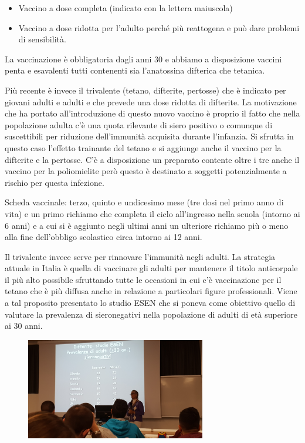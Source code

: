 \begin{itemize}
\item
  Vaccino a dose completa (indicato con la lettera maiuscola)
\item
  Vaccino a dose ridotta per l'adulto perché più reattogena e può dare
  problemi di sensibilità.
\end{itemize}
  La vaccinazione è obbligatoria dagli anni 30 e abbiamo a disposizione
  vaccini penta e esavalenti tutti contenenti sia l'anatossina difterica
  che tetanica.

  Più recente è invece il trivalente (tetano, difterite, pertosse) che è
  indicato per giovani adulti e adulti e che prevede una dose ridotta di
  difterite. La motivazione che ha portato all'introduzione di questo
  nuovo vaccino è proprio il fatto che nella popolazione adulta c'è una
  quota rilevante di siero positivo o comunque di suscettibili per
  riduzione dell'immunità acquisita durante l'infanzia. Si sfrutta in
  questo caso l'effetto trainante del tetano e si aggiunge anche il
  vaccino per la difterite e la pertosse. C'è a disposizione un
  preparato contente oltre i tre anche il vaccino per la poliomielite
  però questo è destinato a soggetti potenzialmente a rischio per questa
  infezione.

  Scheda vaccinale: terzo, quinto e undicesimo mese (tre dosi nel primo
  anno di vita) e un primo richiamo che completa il ciclo all'ingresso
  nella scuola (intorno ai 6 anni) e a cui si è aggiunto negli ultimi
  anni un ulteriore richiamo più o meno alla fine dell'obbligo
  scolastico circa intorno ai 12 anni.

  Il trivalente invece serve per rinnovare l'immunità negli adulti. La
  strategia attuale in Italia è quella di vaccinare gli adulti per
  mantenere il titolo anticorpale il più alto possibile sfruttando tutte
  le occasioni in cui c'è vaccinazione per il tetano che è più diffusa
  anche in relazione a particolari figure professionali. Viene a tal
  proposito presentato lo studio ESEN che si poneva come obiettivo
  quello di valutare la prevalenza di sieronegativi nella popolazione di
  adulti di età superiore ai 30 anni.

  \begin{figure}[!ht]
\centering
\includegraphics[width=0.7\textwidth]{06/image5.jpeg}
\end{figure}

